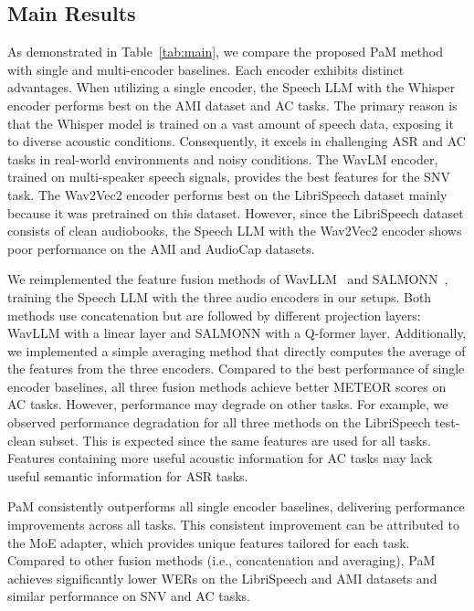 \subsection{Main Results}

As demonstrated in Table~\ref{tab:main}, we compare the proposed PaM method with single and multi-encoder baselines. Each encoder exhibits distinct advantages. When utilizing a single encoder, the Speech LLM with the Whisper encoder performs best on the AMI dataset and AC tasks. The primary reason is that the Whisper model is trained on a vast amount of speech data, exposing it to diverse acoustic conditions. Consequently, it excels in challenging ASR and AC tasks in real-world environments and noisy conditions. The WavLM encoder, trained on multi-speaker speech signals, provides the best features for the SNV task. The Wav2Vec2 encoder performs best on the LibriSpeech dataset mainly because it was pretrained on this dataset. However, since the LibriSpeech dataset consists of clean audiobooks, the Speech LLM with the Wav2Vec2 encoder shows poor performance on the AMI and AudioCap datasets.

We reimplemented the feature fusion methods of WavLLM~\cite{hu2024wavllmrobustadaptivespeech} and SALMONN~\cite{tang2024salmonn}, training the Speech LLM with the three audio encoders in our setups. Both methods use concatenation but are followed by different projection layers: WavLLM with a linear layer and SALMONN with a Q-former layer. Additionally, we implemented a simple averaging method that directly computes the average of the features from the three encoders. Compared to the best performance of single encoder baselines, all three fusion methods achieve better METEOR scores on AC tasks. However, performance may degrade on other tasks. For example, we observed performance degradation for all three methods on the LibriSpeech test-clean subset. This is expected since the same features are used for all tasks. Features containing more useful acoustic information for AC tasks may lack useful semantic information for ASR tasks.

PaM consistently outperforms all single encoder baselines, delivering performance improvements across all tasks. This consistent improvement can be attributed to the MoE adapter, which provides unique features tailored for each task. Compared to other fusion methods (i.e., concatenation and averaging), PaM achieves significantly lower WERs on the LibriSpeech and AMI datasets and similar performance on SNV and AC tasks.

